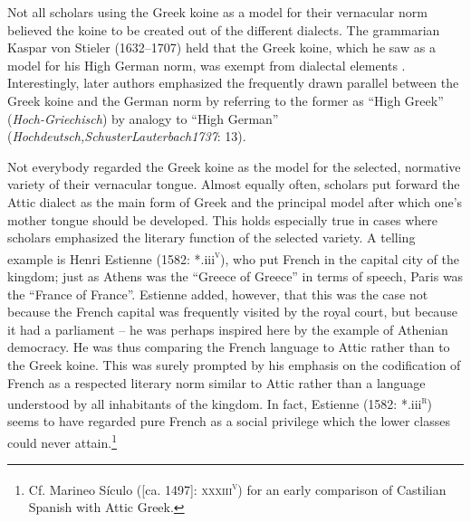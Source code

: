 \documentclass[output=paper]{langsci/langscibook}
\begin{document}
Not all scholars using the Greek koine as a model for their vernacular norm believed the koine to be created out of the different dialects. The grammarian Kaspar von Stieler (1632–1707) held that the Greek koine, which he saw as a model for his High German norm, was exempt from dialectal elements \citep[2]{Stieler1691}. Interestingly, later authors emphasized the frequently drawn parallel between the Greek koine and the German norm by referring to the former as “High Greek” (\textit{Hoch-Griechisch}) by analogy to “High German” (\textit{Hochdeutsch,SchusterLauterbach1737}: 13).

Not everybody regarded the Greek koine as the model for the selected, normative variety of their vernacular tongue. Almost equally often, scholars put forward the Attic dialect as the main form of Greek and the principal model after which one’s mother tongue should be developed. This holds especially true in cases where scholars emphasized the literary function of the selected variety. A telling example is Henri Estienne (1582: *.iii\textsc{\textsuperscript{v}}), who put French in the capital city of the kingdom; just as Athens was the “Greece of Greece” in terms of speech, Paris was the “France of France”. Estienne added, however, that this was the case not because the French capital was frequently visited by the royal court, but because it had a parliament – he was perhaps inspired here by the example of Athenian democracy. He was thus comparing the French language to Attic rather than to the Greek koine. This was surely prompted by his emphasis on the codification of French as a respected literary norm similar to Attic rather than a language understood by all inhabitants of the kingdom. In fact, Estienne (1582: *.iii\textsc{\textsuperscript{r}}) seems to have regarded pure French as a social privilege which the lower classes could never attain.\footnote{Cf. Marineo Sículo ([ca. 1497]: \textsc{xxxiii}\textsc{\textsuperscript{v}}) for an early comparison of Castilian Spanish with Attic Greek.}
\end{document}
